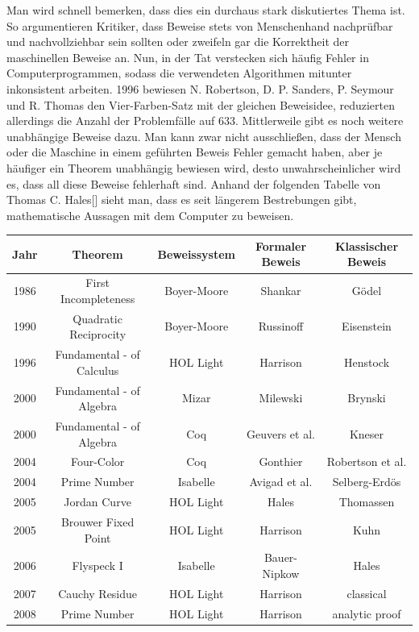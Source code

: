 Man wird schnell bemerken, dass dies ein durchaus stark diskutiertes Thema ist. So argumentieren Kritiker, dass Beweise stets von Menschenhand nachprüfbar und nachvollziehbar sein sollten oder zweifeln gar die Korrektheit der maschinellen Beweise an. Nun, in der Tat verstecken sich häufig Fehler in Computerprogrammen, sodass die verwendeten Algorithmen mitunter inkonsistent arbeiten. 1996 bewiesen N. Robertson, D. P. Sanders, P. Seymour und R. Thomas den Vier-Farben-Satz mit der gleichen Beweisidee, reduzierten allerdings die Anzahl der Problemfälle auf 633. Mittlerweile gibt es noch weitere unabhängige Beweise dazu. Man kann zwar nicht ausschließen, dass der Mensch oder die Maschine in einem geführten Beweis Fehler gemacht haben, aber je häufiger ein Theorem unabhängig bewiesen wird, desto
unwahrscheinlicher wird es, dass all diese Beweise fehlerhaft sind. Anhand der folgenden Tabelle von Thomas C. Hales[] sieht man, dass es seit längerem Bestrebungen gibt, mathematische Aussagen mit dem Computer zu beweisen.

\begin{table}
\begin{tabular}{ccccc}
\toprule
Jahr & Theorem & Beweissystem & Formaler Beweis & Klassischer Beweis \\ \midrule
1986 & First Incompleteness & Boyer-Moore & Shankar & Gödel \\
1990 & Quadratic Reciprocity & Boyer-Moore & Russinoff & Eisenstein \\
1996 & Fundamental - of Calculus & HOL Light & Harrison & Henstock \\
2000 & Fundamental - of Algebra & Mizar & Milewski & Brynski \\
2000 & Fundamental - of Algebra & Coq & Geuvers et al. & Kneser \\
2004 & Four-Color & Coq & Gonthier & Robertson et al. \\
2004 & Prime Number & Isabelle & Avigad et al. & Selberg-Erdös \\
2005 & Jordan Curve & HOL Light & Hales & Thomassen \\
2005 & Brouwer Fixed Point & HOL Light & Harrison & Kuhn \\
2006 & Flyspeck I & Isabelle & Bauer-Nipkow & Hales \\
2007 & Cauchy Residue & HOL Light & Harrison & classical \\
2008 & Prime Number & HOL Light & Harrison & analytic proof \\
\bottomrule
\end{tabular}
\end{table}

